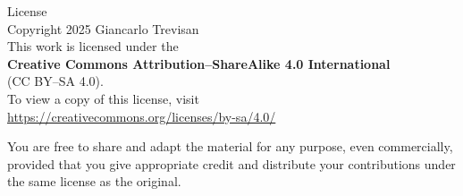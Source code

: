 \cleardoublepage
\thispagestyle{empty}
\begin{center}
{\Large License}\\[1.25em]
Copyright \textcopyright{} 2025 Giancarlo Trevisan\\[0.75em]
This work is licensed under the\\
{\bfseries Creative Commons Attribution--ShareAlike 4.0 International}\\
(CC BY--SA 4.0).\\[0.75em]
To view a copy of this license, visit\\
\url{https://creativecommons.org/licenses/by-sa/4.0/}
\end{center}

\vfill
\noindent You are free to share and adapt the material for any purpose, even commercially, provided that you give appropriate credit and distribute your contributions under the same license as the original.
